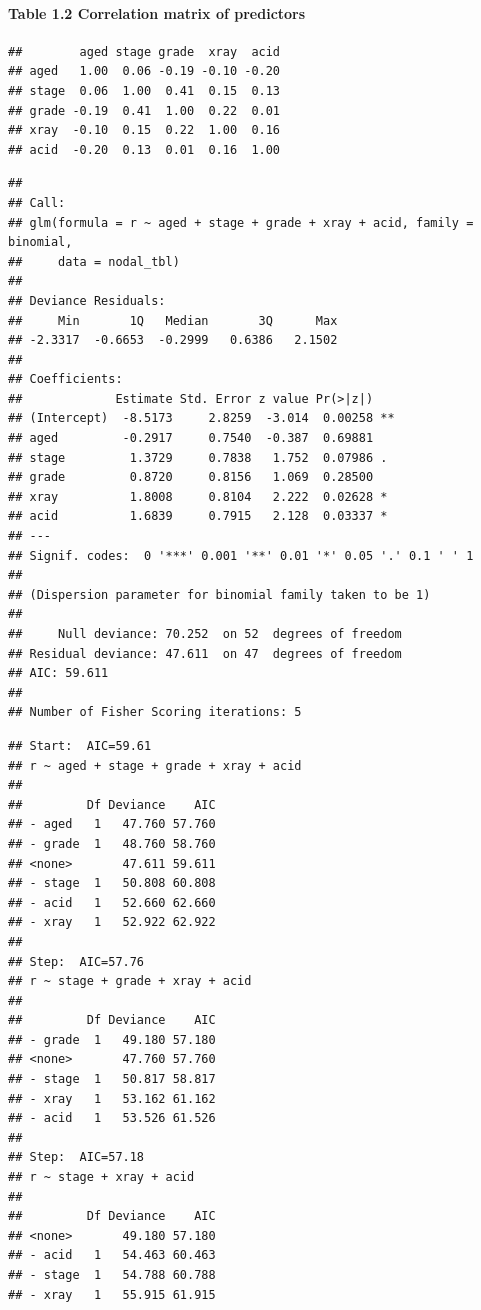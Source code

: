 \documentclass[]{article}
\let\oldparagraph\paragraph
\renewcommand{\paragraph}[1]{\oldparagraph{#1}\mbox{}}
\begin{document}
\paragraph{Table 1.2 Correlation matrix of
predictors}\label{table-1.2-correlation-matrix-of-predictors}

\begin{verbatim}
##        aged stage grade  xray  acid
## aged   1.00  0.06 -0.19 -0.10 -0.20
## stage  0.06  1.00  0.41  0.15  0.13
## grade -0.19  0.41  1.00  0.22  0.01
## xray  -0.10  0.15  0.22  1.00  0.16
## acid  -0.20  0.13  0.01  0.16  1.00
\end{verbatim}

\begin{verbatim}
## 
## Call:
## glm(formula = r ~ aged + stage + grade + xray + acid, family = binomial, 
##     data = nodal_tbl)
## 
## Deviance Residuals: 
##     Min       1Q   Median       3Q      Max  
## -2.3317  -0.6653  -0.2999   0.6386   2.1502  
## 
## Coefficients:
##             Estimate Std. Error z value Pr(>|z|)   
## (Intercept)  -8.5173     2.8259  -3.014  0.00258 **
## aged         -0.2917     0.7540  -0.387  0.69881   
## stage         1.3729     0.7838   1.752  0.07986 . 
## grade         0.8720     0.8156   1.069  0.28500   
## xray          1.8008     0.8104   2.222  0.02628 * 
## acid          1.6839     0.7915   2.128  0.03337 * 
## ---
## Signif. codes:  0 '***' 0.001 '**' 0.01 '*' 0.05 '.' 0.1 ' ' 1
## 
## (Dispersion parameter for binomial family taken to be 1)
## 
##     Null deviance: 70.252  on 52  degrees of freedom
## Residual deviance: 47.611  on 47  degrees of freedom
## AIC: 59.611
## 
## Number of Fisher Scoring iterations: 5
\end{verbatim}

\begin{verbatim}
## Start:  AIC=59.61
## r ~ aged + stage + grade + xray + acid
## 
##         Df Deviance    AIC
## - aged   1   47.760 57.760
## - grade  1   48.760 58.760
## <none>       47.611 59.611
## - stage  1   50.808 60.808
## - acid   1   52.660 62.660
## - xray   1   52.922 62.922
## 
## Step:  AIC=57.76
## r ~ stage + grade + xray + acid
## 
##         Df Deviance    AIC
## - grade  1   49.180 57.180
## <none>       47.760 57.760
## - stage  1   50.817 58.817
## - xray   1   53.162 61.162
## - acid   1   53.526 61.526
## 
## Step:  AIC=57.18
## r ~ stage + xray + acid
## 
##         Df Deviance    AIC
## <none>       49.180 57.180
## - acid   1   54.463 60.463
## - stage  1   54.788 60.788
## - xray   1   55.915 61.915
\end{verbatim}
\end{document}

